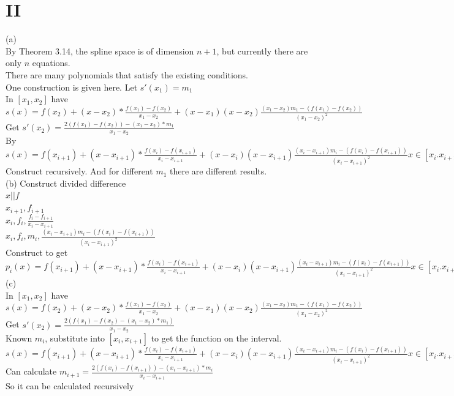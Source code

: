 \documentclass[a4paper]{article}
\begin{document}
\section*{II}
(a)\\
By Theorem 3.14, the spline space is of dimension \( n+1 \), but currently there are only \( n \) equations.\\
There are many polynomials that satisfy the existing conditions.\\
One construction is given here. Let $s'(x_1)=m_1$\\
In $[x_1,x_2]$ have $s(x)=f(x_2)+(x-x_2)*\frac{f(x_1)-f(x_2)}{x_1-x_2}+(x-x_1)(x-x_2)\frac{(x_1-x_2)m_1-(f(x_1)-f(x_2))}{(x_1-x_2)^2}$\\
Get $s'(x_2)=\frac{2(f(x_1)-f(x_2))-(x_1-x_2)*m_1}{x_1-x_2}$\\
By $s(x)=f(x_{i+1})+(x-x_{i+1})*\frac{f(x_i)-f(x_{i+1})}{x_i-x_{i+1}}+(x-x_i)(x-x_{i+1})\frac{(x_i-x_{i+1})m_i-(f(x_i)-f(x_{i+1}))}{(x_i-x_{i+1})^2} x\in [x_i.x_{i+1}]$\\
Construct recursively. And for different $m_1$ there are different results.\\
(b)
Construct divided difference\\
$x||f$\\
$x_{i+1},f_{i+1}$\\
$x_i,f_i ,\frac{f_i-f_{i+1}}{x_i-x_{i+1}}$\\
$x_i,f_i, m_i,\frac{(x_i-x_{i+1})m_i-(f(x_i)-f(x_{i+1}))}{(x_i-x_{i+1})^2}$\\
Construct to get\\
$p_i(x)=f(x_{i+1})+(x-x_{i+1})*\frac{f(x_i)-f(x_{i+1})}{x_i-x_{i+1}}+(x-x_i)(x-x_{i+1})\frac{(x_i-x_{i+1})m_i-(f(x_i)-f(x_{i+1}))}{(x_i-x_{i+1})^2} x\in [x_i.x_{i+1}]$\\
(c)\\
In $[x_1,x_2]$ have $s(x)=f(x_2)+(x-x_2)*\frac{f(x_1)-f(x_2)}{x_1-x_2}+(x-x_1)(x-x_2)\frac{(x_1-x_2)m_1-(f(x_1)-f(x_2))}{(x_1-x_2)^2}$\\
Get $s'(x_2)=\frac{2(f(x_1)-f(x_2)-(x_1-x_2)*m_1)}{x_1-x_2}$\\
Known $m_i$, substitute into $[x_i,x_{i+1}]$ to get the function on the interval.\\
$s(x)=f(x_{i+1})+(x-x_{i+1})*\frac{f(x_i)-f(x_{i+1})}{x_i-x_{i+1}}+(x-x_i)(x-x_{i+1})\frac{(x_i-x_{i+1})m_i-(f(x_i)-f(x_{i+1}))}{(x_i-x_{i+1})^2} x\in [x_i.x_{i+1}]$\\
Can calculate $m_{i+1}=\frac{2(f(x_i)-f(x_{i+1}))-(x_i-x_{i+1})*m_i}{x_i-x_{i+1}}$\\
So it can be calculated recursively\\
\end{document}
